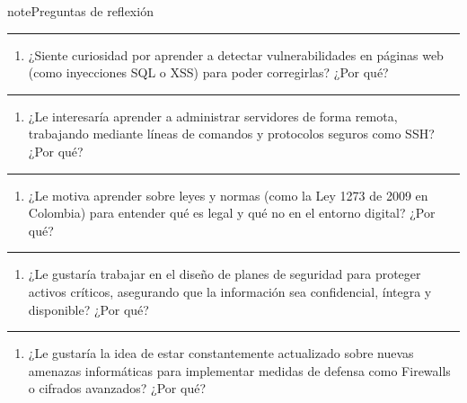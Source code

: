 \documentclass[letterpaper,10pt,spanish]{sphinxmanual}
\begin{document}
\begin{sphinxadmonition}{note}{Preguntas de reflexión}
\begin{enumerate}
\end{enumerate}


\bigskip\hrule\bigskip

\begin{enumerate}
%
\setcounter{enumi}{5}
\item {} 
\sphinxAtStartPar
¿Siente curiosidad por aprender a detectar vulnerabilidades en páginas web (como inyecciones SQL o XSS) para poder corregirlas? ¿Por qué?

\end{enumerate}


\bigskip\hrule\bigskip

\begin{enumerate}
%
\setcounter{enumi}{6}
\item {} 
\sphinxAtStartPar
¿Le interesaría aprender a administrar servidores de forma remota, trabajando mediante líneas de comandos y protocolos seguros como SSH? ¿Por qué?

\end{enumerate}


\bigskip\hrule\bigskip

\begin{enumerate}
%
\setcounter{enumi}{7}
\item {} 
\sphinxAtStartPar
¿Le motiva aprender sobre leyes y normas (como la Ley 1273 de 2009 en Colombia) para entender qué es legal y qué no en el entorno digital? ¿Por qué?

\end{enumerate}


\bigskip\hrule\bigskip

\begin{enumerate}
%
\setcounter{enumi}{8}
\item {} 
\sphinxAtStartPar
¿Le gustaría trabajar en el diseño de planes de seguridad para proteger activos críticos, asegurando que la información sea confidencial, íntegra y disponible? ¿Por qué?

\end{enumerate}


\bigskip\hrule\bigskip

\begin{enumerate}
%
\setcounter{enumi}{9}
\item {} 
\sphinxAtStartPar
¿Le gustaría la idea de estar constantemente actualizado sobre nuevas amenazas informáticas para implementar medidas de defensa como Firewalls o cifrados avanzados? ¿Por qué?

\end{enumerate}
\end{sphinxadmonition}
\end{document}
